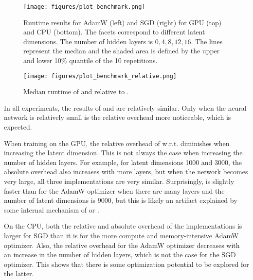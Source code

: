 \documentclass[article]{jss}
\theoremstyle{definition}
\begin{document}
\begin{figure}[h]
    \centering
    \texttt{[image: figures/plot\_benchmark.png]}
    \caption{Runtime results for AdamW (left) and SGD (right) for GPU (top) and CPU (bottom). The facets correspond to different latent dimensions. The number of hidden layers is $0, 4, 8, 12, 16$.
    The lines represent the median and the shaded area is defined by the upper and lower 10\% quantile of the 10 repetitions.
}
    \label{fig:optimizer-benchmark}
\end{figure}

\begin{figure}[h]
    \centering
    \texttt{[image: figures/plot\_benchmark\_relative.png]}
    \caption{Median runtime of \mlrttorch{}  and \torch{} relative to \pytorch{}.}
    \label{fig:optimizer-benchmark-relative}
\end{figure}



In all experiments, the results of \torch{} and \mlrttorch{} are relatively similar.
Only when the neural network is relatively small is the relative overhead more noticeable, which is expected.

When training on the GPU, the relative overhead of \torch{} w.r.t. \pytorch{} diminishes when increasing the latent dimension.
This is not always the case when increasing the number of hidden layers.
For example, for latent dimensions 1000 and 3000, the absolute overhead also increases with more layers, but when the network becomes very large, all three implementations are very similar.
Surprisingly, \mlrttorch{} is slightly faster than \torch{} for the AdamW optimizer when there are many layers and the number of latent dimensions is 9000, but this is likely an artifact explained by some internal mechanism of \torch{} or \libtorch{}.

On the CPU, both the relative and absolute overhead of the \rlang{} implementations is larger for SGD than it is for the more compute and memory-intensive AdamW optimizer.
Also, the relative overhead for the AdamW optimizer decreases with an increase in the number of hidden layers, which is not the case for the SGD optimizer.
This shows that there is some optimization potential to be explored for the latter.
\end{document}
